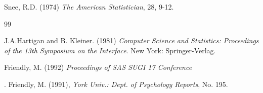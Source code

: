 \documentclass[a4paper]{report}
\begin{document}
\begin{thebibiography}{99}

Snee, R.D. (1974) \textit{ The American Statistician},  28, 9-12.
\end{thebibiography}{99}

J.A.Hartigan and B. Kleiner. (1981) \textit{ Computer Science and
Statistics: Proceedings of the 13th Symposium on the Interface}. New
York: Springer-Verlag.

Friendly, M. (1992) \textit{Proceedings of SAS SUGI 17 Conference}

. Friendly, M. (1991),   \textit{York Univ.: Dept. of Psychology
Reports}, No. 195.
\end{document}

